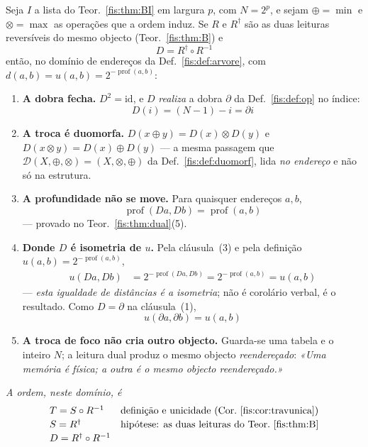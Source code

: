 \documentclass[livro.tex]{subfiles}
\begin{document}
\begin{teorema}\label{fis:thm:troca-realizacao}
Seja $I$ a lista do Teor.~\ref{fis:thm:BI} em largura $p$, com $N=2^{p}$, e
sejam $\oplus=\min$ e $\otimes=\max$ as operações que a ordem induz. Se $R$ e
$R^{\dagger}$ são as duas leituras reversíveis do mesmo objecto
(Teor.~\ref{fis:thm:B}) e
\[
\boxed{\;D=R^{\dagger}\circ R^{-1}\;}
\]
então, no domínio de endereços da Def.~\ref{fis:def:arvore}, com
$d(a,b)=u(a,b)=2^{-\operatorname{prof}(a,b)}$:
\begin{enumerate}\itemsep3pt
\item[(1)] \textbf{A dobra fecha.} $D^{2}=\mathrm{id}$, e $D$ \emph{realiza} a
dobra $\partial$ da Def.~\ref{fis:def:op} no índice:
\[
\boxed{\;D(i)=(N-1)-i=\partial i\;}
\]
\item[(2)] \textbf{A troca é duomorfa.} $D(x\oplus y)=D(x)\otimes D(y)$ e
$D(x\otimes y)=D(x)\oplus D(y)$ --- a mesma passagem que
$\mathcal{D}(X,\oplus,\otimes)=(X,\otimes,\oplus)$ da Def.~\ref{fis:def:duomorf},
lida \emph{no endereço} e não só na estrutura.
\item[(3)] \textbf{A profundidade não se move.} Para quaisquer endereços $a,b$,
\[
\boxed{\;\operatorname{prof}(Da,Db)=\operatorname{prof}(a,b)\;}
\]
--- provado no Teor.~\ref{fis:thm:dual}(5).
\item[(4)] \textbf{Donde $D$ é isometria de $u$.} Pela cláusula~(3) e pela
definição $u(a,b)=2^{-\operatorname{prof}(a,b)}$,
\[
\boxed{
\begin{aligned}
u(Da,Db)
&=2^{-\operatorname{prof}(Da,Db)}
=2^{-\operatorname{prof}(a,b)}
=u(a,b)
\end{aligned}}
\]
--- \emph{esta igualdade de distâncias é a isometria}; não é corolário verbal,
é o resultado. Como $D=\partial$ na cláusula~(1),
\[
\boxed{\;u(\partial a,\partial b)=u(a,b)\;}
\]
\item[(5)] \textbf{A troca de foco não cria outro objecto.} Guarda-se uma tabela
e o inteiro $N$; a leitura dual produz o mesmo objecto \emph{reendereçado}:
\emph{«Uma memória é física; a outra é o mesmo objecto reendereçado.»}
\end{enumerate}
\emph{A ordem, neste domínio, é}
\[
\begin{array}{@{}ll@{}}
T=S\circ R^{-1}
  & \text{definição e unicidade (Cor.~\ref{fis:cor:travunica})}\\[2pt]
S=R^{\dagger}
  & \text{hipótese: as duas leituras do Teor.~\ref{fis:thm:B}}\\[2pt]
D=R^{\dagger}\circ R^{-1}

\end{array}\]
\end{teorema}
\end{document}
